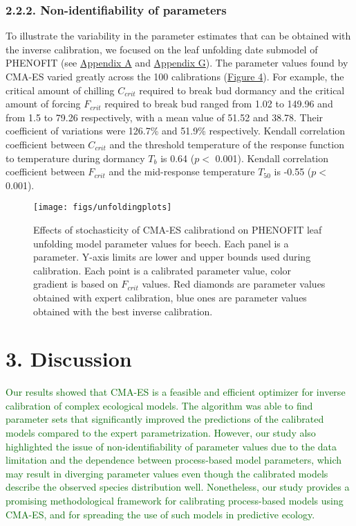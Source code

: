 \documentclass[11pt,]{article}
\begin{document}
\hypertarget{non-identifiability-of-parameters}{%
\subsubsection{2.2.2. Non-identifiability of
parameters}\label{non-identifiability-of-parameters}}

To illustrate the variability in the parameter estimates that can be
obtained with the inverse calibration, we focused on the leaf unfolding
date submodel of PHENOFIT (see \protect\hyperlink{appendixA}{Appendix A}
and \protect\hyperlink{appendixG}{Appendix G}). The parameter values
found by CMA-ES varied greatly across the 100 calibrations
(\hyperref[fig:unfoldingplots]{Figure 4}). For example, the critical
amount of chilling \(C_{crit}\) required to break bud dormancy and the
critical amount of forcing \(F_{crit}\) required to break bud ranged
from 1.02 to 149.96 and from 1.5 to 79.26 respectively, with a mean
value of 51.52 and 38.78. Their coefficient of variations were 126.7\%
and 51.9\% respectively. Kendall correlation coefficient between
\(C_{crit}\) and the threshold temperature of the response function to
temperature during dormancy \(T_b\) is 0.64 (\(p <\) 0.001). Kendall
correlation coefficient between \(F_{crit}\) and the mid-response
temperature \(T_{50}\) is -0.55 (\(p <\) 0.001).

\begin{figure}[H]

{\centering \texttt{[image: figs/unfoldingplots]} 

}

\caption{Effects of stochasticity of CMA-ES calibrationd on PHENOFIT leaf unfolding model parameter values for beech. Each panel is a parameter. Y-axis limits are lower and upper bounds used during calibration. Each point is a calibrated parameter value, color gradient is based on $F_{crit}$ values. Red diamonds are parameter values obtained with expert calibration, blue ones are parameter values obtained with the best inverse calibration.}\label{fig:unfoldingplots}
\end{figure}

\hypertarget{discussion}{%
\section{3. Discussion}\label{discussion}}

\textcolor{darkgreen}{Our results showed that CMA-ES is a feasible and efficient optimizer for inverse calibration of complex ecological models. The algorithm was able to find parameter sets that significantly improved the predictions of the calibrated models compared to the expert parametrization.  However, our study also highlighted the issue of non-identifiability of parameter values due to the data limitation and the dependence between process-based model parameters, which may result in diverging parameter values even though the calibrated models describe the observed species distribution well. Nonetheless, our study provides a promising methodological framework for calibrating process-based models using CMA-ES, and for spreading the use of such models in predictive ecology.}
\end{document}
